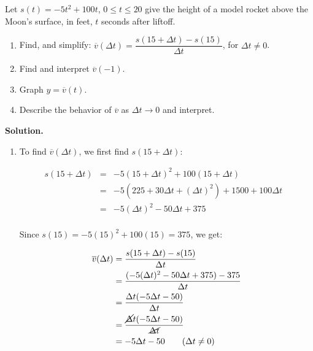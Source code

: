 \begin{ex} \label{averagevelocityrocketexreprise} Let $s(t) = -5t^2+100t$, $0 \leq t \leq 20$ give the height of a model rocket above the Moon's surface, in feet,  $t$ seconds after liftoff.  

\begin{enumerate}

\item  Find, and simplify:  $\overline{v}(\Delta t)  = \dfrac{s(15+ \Delta t) - s(15)}{\Delta t}$, for $\Delta t \neq 0$.

\item  Find and interpret $\overline{v}(-1)$.

\item  Graph $y = \overline{v}(t)$.

\item  Describe the behavior of $\overline{v}$ as $\Delta t \rightarrow 0$ and interpret.

\end{enumerate}

\newpage

{\bf Solution.}

\begin{enumerate}

\item  To find $\overline{v}(\Delta t)$, we first find $s(15+\Delta t)$: 

\[ \begin{array}{rclr}  
  s(15+\Delta t) & = & -5(15+\Delta t)^2 + 100(15+\Delta t) & \\ 
  & = & -5(225+30 \Delta t + (\Delta t)^2) + 1500 + 100 \Delta t& \\
 & = & -5(\Delta t)^2 -50 \Delta t +375 & \\
 \end{array} \]

Since $s(15) = -5(15)^2 + 100(15) = 375$, we get:

\begin{align*}
\overline{v}(\Delta t)& = \dfrac{s(15+ \Delta t) - s(15)}{\Delta t} \\
& = \dfrac{(-5(\Delta t)^2-50 \Delta t + 375) - 375}{\Delta t} \\
& = \dfrac{\Delta t (-5 \Delta t - 50)}{\Delta t} \\
& = \dfrac{\cancel{\Delta} t (-5 \Delta t - 50)}{\cancel{\Delta t}} \\
& = -5 \Delta t - 50 \tag{$\Delta t \neq 0$} \\
\end{align*}


\end{enumerate}
\end{ex}
